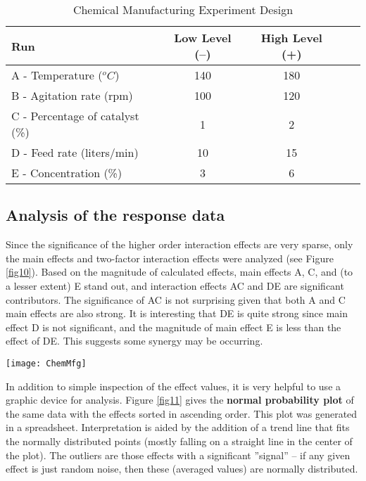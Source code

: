 \begin{table}[h]\caption{Chemical Manufacturing Experiment Design}\label{tab11}
\begin{center}
\begin{tabular}{|l|c|c|c|c|}
\hline Run & Low Level (--) & High Level (+)  \\ 
\hline A - Temperature ($^{o}C $) & 140 & 180  \\
\hline B - Agitation rate (rpm) & 100 & 120 \\
\hline C - Percentage of catalyst (\%) & 1 & 2 \\
\hline D - Feed rate (liters/min) & 10 & 15 \\
\hline E - Concentration (\%) & 3 & 6 \\
\hline
\end{tabular} 
\end{center}
\end{table}

\subsection{Analysis of the response data}
Since the significance of the higher order interaction effects are very sparse, only the main effects and two-factor interaction effects were analyzed (see Figure \ref{fig10}). Based on the magnitude of calculated effects, main effects A, C, and (to a lesser extent) E stand out, and interaction effects AC and DE are significant contributors. The significance of AC is not surprising given that both A and C main effects are also strong. It is interesting that DE is quite strong since main effect D is not significant, and the magnitude of main effect E is less than the effect of DE.  This suggests some synergy may be occurring.

\begin{sidewaysfigure}[h]\caption{Chemical Manufacturing Experiment Analysis Matrix}\label{fig10}
\begin{center}
\texttt{[image: ChemMfg]}
\end{center}
\end{sidewaysfigure}

In addition to simple inspection of the effect values, it is very helpful to use a graphic device for analysis.  Figure \ref{fig11} gives the \textbf{normal probability plot} of the same data with the effects sorted in ascending order.  This plot was generated in a spreadsheet.  Interpretation is aided by the addition of a trend line that fits the normally distributed points (mostly falling on a straight line in the center of the plot).  The outliers are those effects with a significant ''signal'' -- if any given effect is just random noise, then these (averaged values) are normally distributed.

